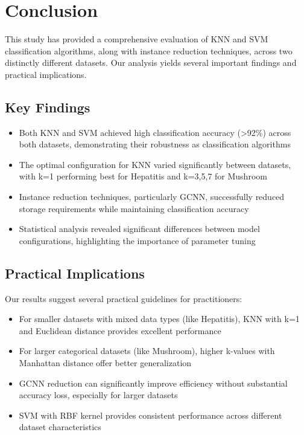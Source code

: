 \section{Conclusion}
\label{sec:conclusion}

This study has provided a comprehensive evaluation of KNN and SVM classification algorithms, along with instance reduction techniques, across two distinctly different datasets. Our analysis yields several important findings and practical implications.

\subsection{Key Findings}

\begin{itemize}
    \item Both KNN and SVM achieved high classification accuracy (>92\%) across both datasets, demonstrating their robustness as classification algorithms
    \item The optimal configuration for KNN varied significantly between datasets, with k=1 performing best for Hepatitis and k=3,5,7 for Mushroom
    \item Instance reduction techniques, particularly GCNN, successfully reduced storage requirements while maintaining classification accuracy
    \item Statistical analysis revealed significant differences between model configurations, highlighting the importance of parameter tuning
\end{itemize}

\subsection{Practical Implications}

Our results suggest several practical guidelines for practitioners:
\begin{itemize}
    \item For smaller datasets with mixed data types (like Hepatitis), KNN with k=1 and Euclidean distance provides excellent performance
    \item For larger categorical datasets (like Mushroom), higher k-values with Manhattan distance offer better generalization
    \item GCNN reduction can significantly improve efficiency without substantial accuracy loss, especially for larger datasets
    \item SVM with RBF kernel provides consistent performance across different dataset characteristics
\end{itemize}

